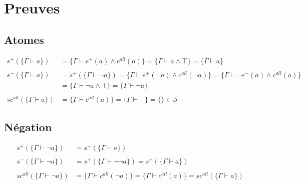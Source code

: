 \documentclass[12pt]{article}
\newcommand{\seq}{\mathcal{S}}
\begin{document}
\newpage

\section*{Preuves}
\subsection*{Atomes}
\begin{align*}
  s^+ (\{\Gamma \vdash a\})      & = \{\Gamma \vdash e^+(a) \land c^{all}(a)\} = \{\Gamma \vdash a \land \top \}= \{\Gamma \vdash a\}                                        \\
  \\
  s^- (\{\Gamma \vdash a\})      & = s^+ (\{\Gamma \vdash \neg a\}) = \{\Gamma \vdash e^+(\neg a) \land c^{all} (\neg a)\} = \{\Gamma \vdash \neg e^-(a) \land c^{all} (a)\} \\
                                 & = \{\Gamma \vdash \neg a \land \top \} = \{\Gamma \vdash \neg a\}                                                                         \\
  \\
  sc^{all} (\{\Gamma \vdash a\}) & = \{\Gamma \vdash c^{all}(a)\}= \{\Gamma \vdash \top \}= \{\} \in \seq
\end{align*}

\subsection*{Négation}
\begin{align*}
  s^+ (\{\Gamma \vdash \neg a\})      & = s^- (\{\Gamma \vdash a\})                                                                        \\
  \\
  s^- (\{\Gamma \vdash \neg a\})      & = s^+ (\{\Gamma \vdash \neg \neg a\}) = s^+ (\{\Gamma \vdash a\})                                  \\
  \\
  sc^{all} (\{\Gamma \vdash \neg a\}) & = \{\Gamma \vdash c^{all}(\neg a)\} = \{\Gamma \vdash c^{all}(a)\}= sc^{all} (\{\Gamma \vdash a\}) \\
\end{align*}
\end{document}
